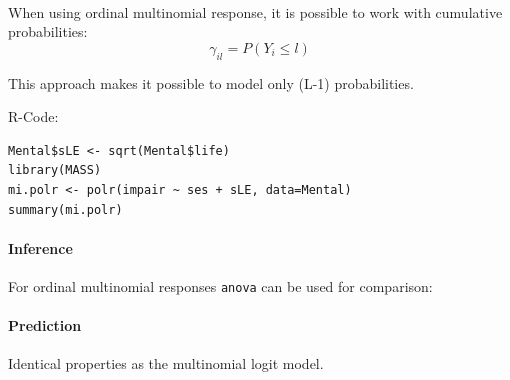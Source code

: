 \mbox{}\\
When using ordinal multinomial response, it is possible to work with cumulative probabilities:
\begin{equation*}
\gamma_{il} = P(Y_i\leq l)
\end{equation*}

This approach makes it possible to model only (L-1) probabilities.

R-Code:
\begin{lstlisting}
Mental$sLE <- sqrt(Mental$life)
library(MASS)
mi.polr <- polr(impair ~ ses + sLE, data=Mental)
summary(mi.polr)
\end{lstlisting}

\paragraph{Inference}
For ordinal multinomial responses \lstinline{anova} can be used for comparison:

\paragraph{Prediction}
Identical properties as the multinomial logit model.
